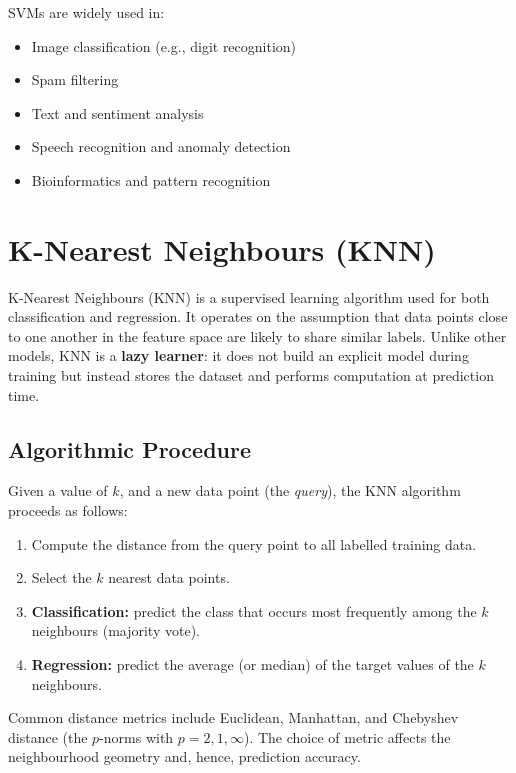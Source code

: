 \documentclass[9pt]{extarticle}
\begin{document}
SVMs are widely used in:

\begin{itemize}
    \item Image classification (e.g., digit recognition)
    \item Spam filtering
    \item Text and sentiment analysis
    \item Speech recognition and anomaly detection
    \item Bioinformatics and pattern recognition
\end{itemize}

\section{K-Nearest Neighbours (KNN)}


K-Nearest Neighbours (KNN) is a supervised learning algorithm used for both classification and regression. It operates on the assumption that data points close to one another in the feature space are likely to share similar labels. Unlike other models, KNN is a \textbf{lazy learner}: it does not build an explicit model during training but instead stores the dataset and performs computation at prediction time.

\subsection{Algorithmic Procedure}

Given a value of $k$, and a new data point (the \textit{query}), the KNN algorithm proceeds as follows:

\begin{enumerate}
    \item Compute the distance from the query point to all labelled training data.
    \item Select the $k$ nearest data points.
    \item \textbf{Classification:} predict the class that occurs most frequently among the $k$ neighbours (majority vote).
    \item \textbf{Regression:} predict the average (or median) of the target values of the $k$ neighbours.
\end{enumerate}

Common distance metrics include Euclidean, Manhattan, and Chebyshev distance (the 
$p$-norms with $p=2,1,\infty$). The choice of metric affects the neighbourhood 
geometry and, hence, prediction accuracy.
\end{document}
